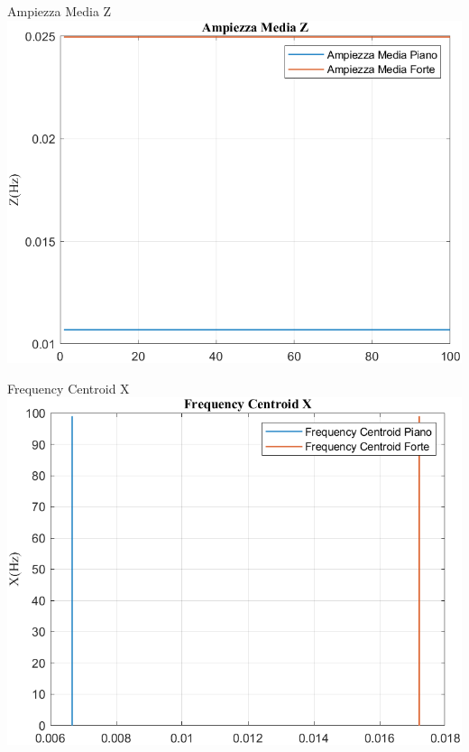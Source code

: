 	\begin{frame}{{Ampiezza Media Z}}					
		\centering\includegraphics[height=.8\textheight]{figure/Vel/Trasformata/Ampiezza MediaZ}
	\end{frame}
	
	\begin{frame}{{Frequency Centroid X}}
		\centering\includegraphics[height=.8\textheight]{figure/Vel/Trasformata/Frequency CentroidX}
	\end{frame}
	
